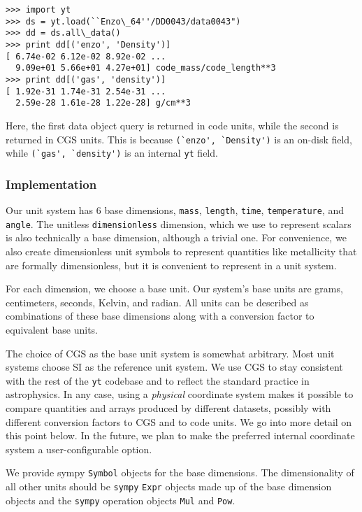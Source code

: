 \begin{Verbatim}
>>> import yt
>>> ds = yt.load(``Enzo\_64''/DD0043/data0043")
>>> dd = ds.all\_data()
>>> print dd[('enzo', 'Density')] 
[ 6.74e-02 6.12e-02 8.92e-02 ... 
  9.09e+01 5.66e+01 4.27e+01] code_mass/code_length**3
>>> print dd[('gas', 'density')] 
[ 1.92e-31 1.74e-31 2.54e-31 ... 
  2.59e-28 1.61e-28 1.22e-28] g/cm**3
\end{Verbatim}

Here, the first data object query is returned in code units, while the second is
returned in CGS units. This is because \verb!(`enzo', `Density')! is an on-disk
field, while \verb!(`gas', `density')! is an internal \texttt{yt} field.

\subsubsection{Implementation}\label{implementation}

Our unit system has 6 base dimensions, \texttt{mass}, \texttt{length},
\texttt{time}, \texttt{temperature}, and \texttt{angle}. The unitless
\texttt{dimensionless} dimension, which we use to represent scalars is also
technically a base dimension, although a trivial one.  For convenience, we also
create dimensionless unit symbols to represent quantities like metallicity that
are formally dimensionless, but it is convenient to represent in a unit system.

For each dimension, we choose a base unit. Our system's base units are grams,
centimeters, seconds, Kelvin, and radian.  All units can be described as
combinations of these base dimensions along with a conversion factor to
equivalent base units.

The choice of CGS as the base unit system is somewhat arbitrary. Most unit
systems choose SI as the reference unit system. We use CGS to stay consistent
with the rest of the \texttt{yt} codebase and to reflect the standard practice
in astrophysics. In any case, using a \emph{physical} coordinate system makes it
possible to compare quantities and arrays produced by different datasets,
possibly with different conversion factors to CGS and to code units. We go into
more detail on this point below.  In the future, we plan to make the preferred
internal coordinate system a user-configurable option.

We provide sympy \texttt{Symbol} objects for the base dimensions. The
dimensionality of all other units should be \texttt{sympy} \texttt{Expr} objects
made up of the base dimension objects and the \texttt{sympy} operation objects
\texttt{Mul} and \texttt{Pow}.

